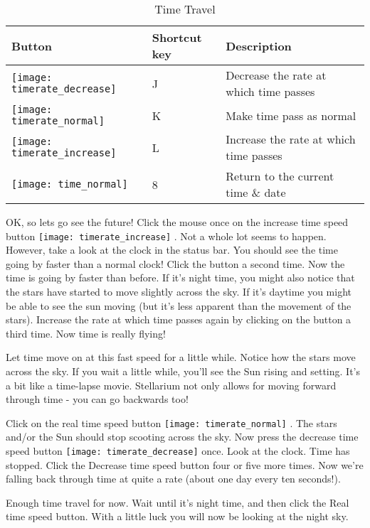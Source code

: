 \begin{table}[h]
\centering
\begin{tabular}{l l l}
\toprule
\textbf{Button} & \textbf{Shortcut key} & \textbf{Description}\\
\midrule
\texttt{[image: timerate\_decrease]} & J & Decrease the rate at which time passes \\
\texttt{[image: timerate\_normal]} & K & Make time pass as normal \\
\texttt{[image: timerate\_increase]} & L & Increase the rate at which time passes \\
\texttt{[image: time\_normal]} & 8 & Return to the current time \& date \\
\bottomrule
\end{tabular}
\caption{Time Travel}
\end{table}

OK, so lets go see the future! Click the mouse once on the increase time
speed button
\texttt{[image: timerate\_increase]}
. Not a whole lot seems to happen. However, take a look at the clock in
the status bar. You should see the time going by faster than a normal
clock! Click the button a second time. Now the time is going by faster
than before. If it's night time, you might also notice that the stars
have started to move slightly across the sky. If it's daytime you might
be able to see the sun moving (but it's less apparent than the movement
of the stars). Increase the rate at which time passes again by clicking
on the button a third time. Now time is really flying!

Let time move on at this fast speed for a little while. Notice how the
stars move across the sky. If you wait a little while, you'll see the
Sun rising and setting. It's a bit like a time-lapse movie. Stellarium
not only allows for moving forward through time - you can go backwards
too!

Click on the real time speed button
\texttt{[image: timerate\_normal]} .
The stars and/or the Sun should stop scooting across the sky. Now press
the decrease time speed button
\texttt{[image: timerate\_decrease]}
once. Look at the clock. Time has stopped. Click the Decrease time speed
button four or five more times. Now we're falling back through time at
quite a rate (about one day every ten seconds!).

Enough time travel for now. Wait until it's night time, and then click
the Real time speed button. With a little luck you will now be looking
at the night sky.

